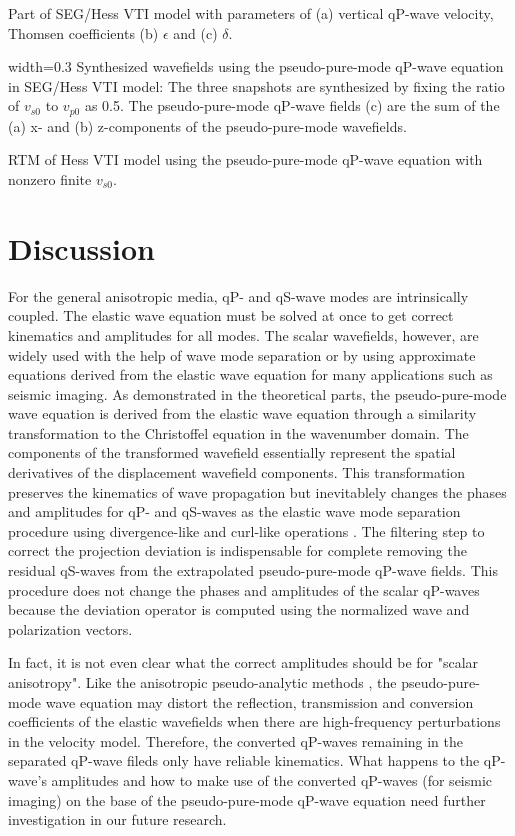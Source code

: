 {
Part of SEG/Hess VTI model with parameters of (a) vertical qP-wave velocity, Thomsen coefficients 
(b) $\epsilon$ and (c) $\delta$.
}

{width=0.3\textwidth}
{
Synthesized wavefields using the pseudo-pure-mode qP-wave equation in SEG/Hess VTI model:
The three snapshots are synthesized by fixing the ratio of $v_{s0}$ to $v_{p0}$ as 0.5.  
The pseudo-pure-mode qP-wave fields (c) are the sum of the (a) x- and (b) z-components 
of the pseudo-pure-mode wavefields.
}

{
RTM of Hess VTI model using the pseudo-pure-mode qP-wave equation with nonzero finite $v_{s0}$.
}
\section{Discussion}

For the general anisotropic media, qP- and qS-wave modes are intrinsically coupled.
The elastic wave equation must be solved at once to get correct kinematics and amplitudes
for all modes. The scalar wavefields, however, are widely used with the help of
wave mode separation or by using approximate equations derived from the elastic wave equation 
for many applications such as seismic imaging.
As demonstrated in the theoretical parts, the pseudo-pure-mode wave equation is derived
from the elastic wave equation through a similarity transformation to the Christoffel
equation in the wavenumber domain. The components of the transformed wavefield essentially
represent the spatial derivatives of the displacement wavefield components.
This transformation preserves the kinematics of wave propagation but inevitablely
changes the phases and amplitudes for qP- and qS-waves as the 
elastic wave mode separation procedure using divergence-like and curl-like operations
\cite[]{dellinger.etgen:1990,yan.sava:2009,zhang.mcmechan:2010}.
The filtering step to correct the projection deviation is indispensable for complete
removing the residual qS-waves from the extrapolated pseudo-pure-mode qP-wave fields.
This procedure does not change the phases and amplitudes of the scalar qP-waves because
the deviation operator is computed using the normalized wave and polarization vectors.

In fact, it is not even clear what the correct amplitudes should be for "scalar anisotropy".
Like the anisotropic pseudo-analytic methods \cite[]{etgen:2009,fomel:2013,zhan:2012,song:2013},
the pseudo-pure-mode wave equation may distort the reflection, transmission and conversion
coefficients of the elastic wavefields when there are high-frequency perturbations in the velocity model.
Therefore, the converted qP-waves remaining in the separated qP-wave fileds only have reliable kinematics. 
What happens to the qP-wave's amplitudes and how to
make use of the converted qP-waves (for seismic imaging) 
on the base of the pseudo-pure-mode qP-wave equation need further investigation in our future research.

